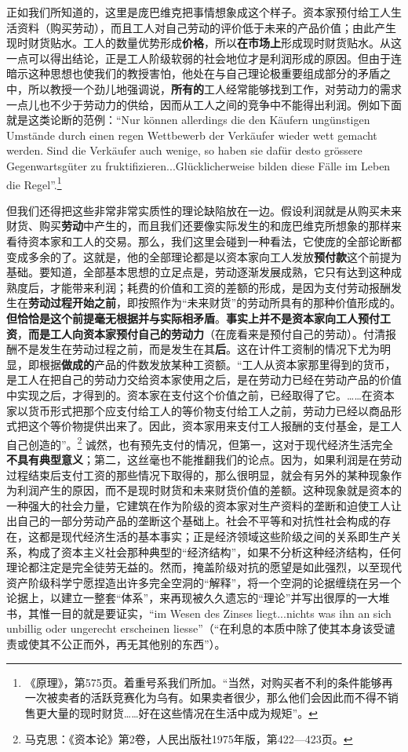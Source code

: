 \documentclass[fontset=fandol, a4paper, 12pt, openright]{ctexbook}
\begin{document}
正如我们所知道的，这里是庞巴维克把事情想象成这个样子。资本家预付给工人生活资料（购买劳动），而且工人对自己劳动的评价低于未来的产品价值；由此产生现时财货贴水。工人的数量优势形成\textbf{价格}，所以\textbf{在市场上}形成现时财货贴水。从这一点可以得出结论，正是工人阶级软弱的社会地位才是利润形成的原因。但由于连暗示这种思想也使我们的教授害怕，他处在与自己理论极重要组成部分的矛盾之中，所以教授一个劲儿地强调说，\textbf{所有的}工人经常能够找到工作，对劳动力的需求一点儿也不少于劳动力的供给，因而从工人之间的竞争中不能得出利润。例如下面就是这类论断的范例：“Nur k\"{o}nnen allerdings die den K\"{a}ufern ung\"{u}nstigen Umst\"{a}nde durch einen regen Wettbewerb der Verk\"{a}ufer wieder wett gemacht werden. Sind die Verk\"{a}ufer auch wenige, so haben sie daf\"{u}r desto gr\"{o}ssere Gegenwartsg\"{u}ter zu fruktifizieren...Gl\"{u}cklicherweise bilden diese F\"{a}lle im Leben die Regel”.\footnote{《原理》，第575页。着重号系我们所加。“当然，对购买者不利的条件能够再一次被卖者的活跃竞赛化为乌有。如果卖者很少，那么他们会因此而不得不销售更大量的现时财货……好在这些情况在生活中成为规矩”。}

但我们还得把这些非常非常实质性的理论缺陷放在一边。假设利润就是从购买未来财货、购买\textbf{劳动}中产生的，而且我们还要像实际发生的和庞巴维克所想象的那样来看待资本家和工人的交易。那么，我们这里会碰到一种看法，它使庞的全部论断都变成多余的了。这就是，他的全部理论都是以资本家向工人发放\textbf{预付款}这个前提为基础。要知道，全部基本思想的立足点是，劳动逐渐发展成熟，它只有达到这种成熟度后，才能带来利润；耗费的价值和工资的差额的形成，是因为支付劳动报酬发生在\textbf{劳动过程开始之前}，即按照作为“未来财货”的劳动所具有的那种价值形成的。\textbf{但恰恰是这个前提毫无根据并与实际相矛盾}。\textbf{事实上并不是资本家向工人预付工资}，\textbf{而是工人向资本家预付自己的劳动力}（在庞看来是预付自己的劳动）。付清报酬不是发生在劳动过程之前，而是发生在其\textbf{后}。这在计件工资制的情况下尤为明显，即根据\textbf{做成的}产品的件数发放某种工资额。“工人从资本家那里得到的货币，是工人在把自己的劳动力交给资本家使用之后，是在劳动力已经在劳动产品的价值中实现之后，才得到的。资本家在支付这个价值之前，已经取得了它。……在资本家以货币形式把那个应支付给工人的等价物支付给工人之前，劳动力已经以商品形式把这个等价物提供出来了。因此，资本家用来支付工人报酬的支付基金，是工人自己创造的”。\footnote{马克思：《资本论》第2卷，人民出版社1975年版，第422—423页。} 诚然，也有预先支付的情况，但第一，这对于现代经济生活完全\textbf{不具有典型意义}；第二，这丝毫也不能推翻我们的论点。因为，如果利润是在劳动过程结束后支付工资的那些情况下取得的，那么很明显，就会有另外的某种现象作为利润产生的原因，而不是现时财货和未来财货价值的差额。这种现象就是资本的一种强大的社会力量，它建筑在作为阶级的资本家对生产资料的垄断和迫使工人让出自己的一部分劳动产品的垄断这个基础上。社会不平等和对抗性社会构成的存在，这都是现代经济生活的基本事实；正是经济领域这些阶级之间的关系即生产关系，构成了资本主义社会那种典型的“经济结构”，如果不分析这种经济结构，任何理论都注定是完全徒劳无益的。然而，掩盖阶级对抗的愿望是如此强烈，以至现代资产阶级科学宁愿捏造出许多完全空洞的“解释”，将一个空洞的论据缠绕在另一个论据上，以建立一整套“体系”，来再现被久久遗忘的“理论”并写出很厚的一大堆书，其惟一目的就是要证实，“im Wesen des Zinses liegt...nichts was ihn an sich unbillig oder ungerecht erscheinen liesse”（“在利息的本质中除了使其本身该受谴责或使其不公正而外，再无其他别的东西”）。
\end{document}
